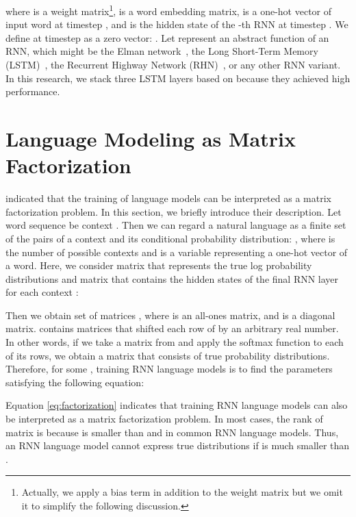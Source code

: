 \documentclass[11pt,a4paper]{article}
\begin{document}
where  is a weight matrix\footnote{Actually, we apply a bias term in addition to the weight matrix but we omit it to simplify the following discussion.},  is a word embedding matrix,  is a one-hot vector of input word  at timestep , and  is the hidden state of the -th RNN at timestep .
We define  at timestep  as a zero vector: .
Let  represent an abstract function of an RNN, which might be the Elman network~\cite{elman1990finding}, the Long Short-Term Memory (LSTM)~\cite{Hochreiter:1997:LSM:1246443.1246450}, the Recurrent Highway Network (RHN)~\cite{zilly2016recurrent}, or any other RNN variant.
In this research, we stack three LSTM layers based on  because they achieved high performance.



\section{Language Modeling as Matrix Factorization}
\label{sec:mos}
 indicated that the training of language models can be interpreted as a matrix factorization problem.
In this section, we briefly introduce their description.
Let word sequence  be context .
Then we can regard a natural language as a finite set of the pairs of a context and its conditional probability distribution: , where  is the number of possible contexts and  is a variable representing a one-hot vector of a word.
Here, we consider matrix  that represents the true log probability distributions and matrix  that contains the hidden states of the final RNN layer for each context :

Then we obtain set of matrices , where  is an all-ones matrix, and  is a diagonal matrix.
 contains matrices that shifted each row of  by an arbitrary real number.
In other words, if we take a matrix from  and apply the softmax function to each of its rows, we obtain a matrix that consists of true probability distributions.
Therefore, for some , training RNN language models is to find the parameters satisfying the following equation:



Equation \ref{eq:factorization} indicates that training RNN language models can also be interpreted as a matrix factorization problem.
In most cases, the rank of matrix  is  because  is smaller than  and  in common RNN language models.
Thus, an RNN language model cannot express true distributions if  is much smaller than .
\end{document}
